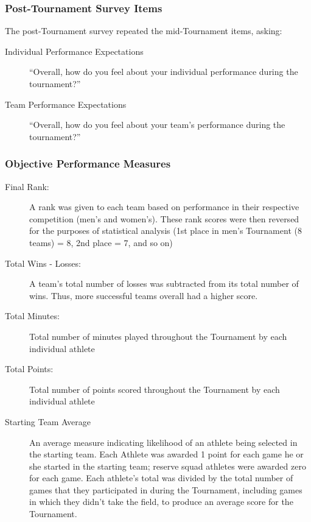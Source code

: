 \subsubsection{Post-Tournament Survey Items\label{app8:surveyPost}}
The post-Tournament survey repeated the mid-Tournament items, asking:
\begin{description}
\item [Individual Performance Expectations] ``Overall, how do you feel about your individual performance during the tournament?''
\item [Team Performance Expectations]``Overall, how do you feel about your team's performance during the tournament?''
\end{description}

\subsubsection{Objective Performance Measures\label{app8:objectivePerformance}}

\begin{description}
\item [Final Rank:] A rank was given to each team based on performance in their respective competition (men's and women's). These rank scores were then reversed for the purposes of statistical analysis (1st place in men's Tournament (8 teams) = 8, 2nd place = 7, and so on)
\item [Total Wins - Losses:] A team's total number of losses was subtracted from its total number of wins.  Thus, more successful teams overall had a higher score.
\item [Total Minutes:] Total number of minutes played throughout the Tournament by each individual athlete
\item [Total Points:] Total number of points scored throughout the Tournament by each individual athlete
\item [Starting Team Average] An average measure indicating likelihood of an athlete being selected in the starting team. Each Athlete was awarded 1 point for each game he or she started in the starting team; reserve squad athletes were awarded zero for each game. Each athlete's total was divided by the total number of games that they participated in during the Tournament, including games in which they didn't take the field, to produce an average score for the Tournament.
\end{description}







